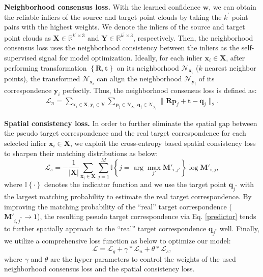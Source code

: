 \documentclass[letterpaper]{article} %
\begin{document}
	\noindent \textbf{Neighborhood consensus loss.}
	With the learned confidence $\mathbf{w}$, we can obtain the reliable inliers of the source and target point clouds by taking the $k^\prime$ point pairs with the highest weights.
	We denote the inliers of the source and target point clouds as $\mathbf{X}\in \mathbb{R}^{k^{\prime}\times3}$ and $\mathbf{Y}\in \mathbb{R}^{k^{\prime}\times3}$, respectively.
	Then, the neighborhood consensus loss uses the neighborhood consistency between the inliers as the self-supervised signal for model optimization.
	Ideally, for each inlier ${\mathbf{x}_i \in \mathbf{X}}$, after performing transformation $\left\{\mathbf{R},\mathbf{t}\right\}$ on its neighborhood $\mathcal{N}_{\mathbf{x}_i}$ ($k$ nearest neighbor points), the transformed $\mathcal{N}_{\mathbf{x}_i}$ can align the neighborhood $\mathcal{N}_{\mathbf{y}_i}$ of its correspondence $\mathbf{y}_i$ perfectly.
	Thus, the neighborhood consensus loss is defined as:
	\begin{equation}
	\begin{split}
	 \mathcal{L}_{n} = \sum_{\mathbf{x}_i \in \mathbf{X}, \mathbf{y}_i \in \mathbf{Y}} \sum_{\mathbf{p}_j \in \mathcal{N}_{\mathbf{x}_i}, \mathbf{q}_j \in \mathcal{N}_{\mathbf{y}_i} } \|\mathbf{R}\mathbf{p}_j + \mathbf{t} - \mathbf{q}_j \|_{2}.
	\end{split}
	\end{equation}

	\noindent \textbf{Spatial consistency loss.}
	In order to further eliminate the spatial gap between the pseudo target correspondence and the real target correspondence for each selected inlier $\mathbf{x}_i \in \mathbf{X}$, we exploit the cross-entropy based spatial consistency loss to sharpen their matching distributions as below:
	\begin{equation}\label{eq}
	\mathcal{L}_s = -\frac{1}{|\mathbf{X}|}\sum_{\mathbf{x}_i\in\mathbf{X}}\sum_{j=1}^M \mathbb{I}\left\{j=\arg\max_{j'}\mathbf{M}'_{i,j'}\right\}\log\mathbf{M}'_{i,j},
	\end{equation}
	where $\mathbb{I}\left\{\cdot\right\}$ denotes the indicator function and we use the target point $\mathbf{q}_{j^*}$ with the largest matching probability to estimate the real target correspondence. By improving the matching probability of the ``real'' target correspondence ($\mathbf{M}'_{i,j^*}\rightarrow 1$), the resulting pseudo target correspondence via Eq. \ref{predictor} tends to further spatially approach to the ``real'' target correspondence $\mathbf{q}_{j^*}$ well.
	Finally, we utilize a comprehensive loss function as below to optimize our model:
	\begin{equation}
	\mathcal{L} = \mathcal{L}_g + \gamma * \mathcal{L}_{n} + \theta * \mathcal{L}_{s},
	\end{equation}
	where $\gamma$ and $\theta$ are the hyper-parameters to control the weights of the used neighborhood consensus loss and the spatial consistency loss.
\end{document}
